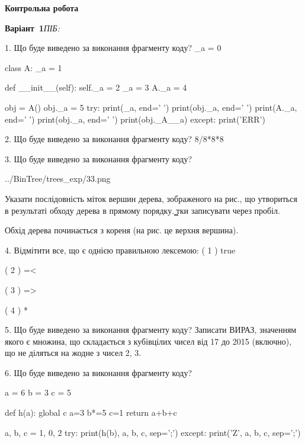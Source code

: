\documentclass[11pt]{article}
\begin{document}
{\large\textbf{Контрольна робота}}

\textbf{Варіант \No\,1}\hfill \textit{ПІБ:}\,\underline{\hspace{60mm}}
\vspace{4mm}

1. Що буде виведено за виконання фрагменту коду?
_a = 0

class A:
    _a = 1
    
    def __init__(self):
        self._a = 2
        _a = 3
        A._a = 4

obj = A()
obj._a = 5
try:
    print(_a, end=' ')
    print(obj._a, end=' ')
    print(A._a, end=' ')
    print(obj._a, end=' ')
    print(obj._A__a)
except:
    print('ERR')


2. Що буде виведено за виконання фрагменту коду?
8/8*8*8

3. Що буде виведено за виконання фрагменту коду?

\begin{center}
	{../BinTree/trees_exp/33.png}
\end{center}
Указати послідовність міток вершин дерева, зображеного на рис., що утвориться в результаті обходу дерева в прямому порядку. ̳тки записувати через пробіл.\par Обхід дерева починається з кореня (на рис. це верхня вершина).

4. %
Відмітити все, що є однією правильною лексемою:
( 1 ) true

( 2 ) =<

( 3 ) =>

( 4 ) *


5. Що буде виведено за виконання фрагменту коду?
Записати ВИРАЗ, значенням якого є множина, що складається з кубівцілих чисел від 17 до 2015 (включно), що не діляться на жодне з чисел 2, 3.


6. Що буде виведено за виконання фрагменту коду?

a = 6
b = 3
c = 5

def h(a):
global c    a=3
    b*=5
    c=1
    return a+b+c

a, b, c = 1, 0, 2
try:
    print(h(b), a, b, c, sep=';')
except:
    print('Z', a, b, c, sep=';')
\end{document}
